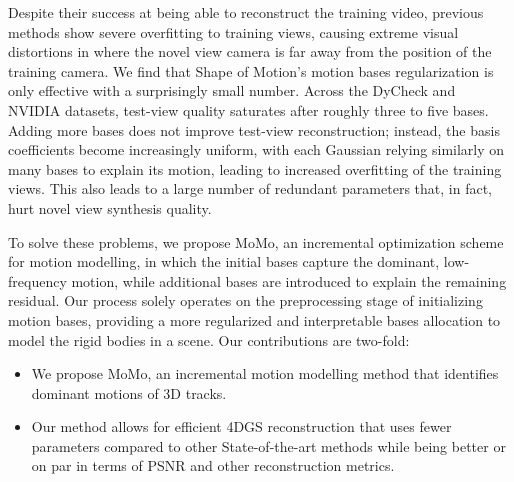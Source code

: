 Despite their success at being able to reconstruct the training video, previous methods show severe overfitting to training views, causing extreme visual distortions in where the novel view camera is far away from the position of the training camera. We find that Shape of Motion's motion bases regularization is only effective with a surprisingly small number. Across the DyCheck \cite{gao2022dynamic}and NVIDIA \cite{yoon2020novel}datasets, test-view quality saturates after roughly three to five bases. Adding more bases does not improve test-view reconstruction; instead, the basis coefficients become increasingly uniform, with each Gaussian relying similarly on many bases to explain its motion, leading to increased overfitting of the training views. This also leads to a large number of redundant parameters that, in fact, hurt novel view synthesis quality.

To solve these problems, we propose MoMo, an incremental optimization scheme for motion modelling, in which the initial bases capture the dominant, low-frequency motion, while additional bases are introduced to explain the remaining residual.
Our process solely operates on the preprocessing stage of initializing motion bases, providing a more regularized and interpretable bases allocation to model the rigid bodies in a scene. Our contributions are two-fold: 

\begin{itemize}
\item{We propose MoMo, an incremental motion modelling method that identifies dominant motions of 3D tracks.}
\item{Our method allows for efficient 4DGS reconstruction that uses fewer parameters compared to other State-of-the-art methods while being better or on par in terms of PSNR and other reconstruction metrics.} 
\end{itemize}








